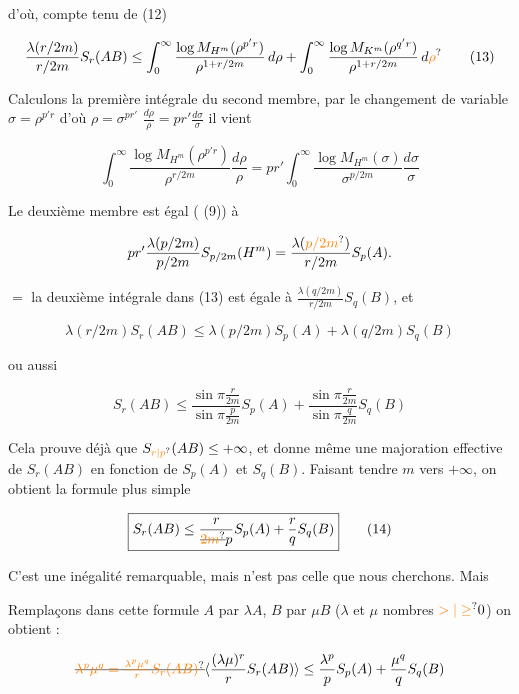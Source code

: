 d'où, compte tenu de (12)

\[
\frac{\lambda(r/2m)}{r/2m}S_r(AB)\leq
\int_0^\infty\frac{\log M_{H^m}(\rho^{p'r})}{\rho^{1+r/2m}}\,d\rho+
\int_0^\infty\frac{\log M_{K^m}(\rho^{q'r})}{\rho^{1+r/2m}}\,d\unsure{\rho}
\tag*{(13)}
\]

Calculons  la première intégrale du second membre, par le changement de variable $\sigma=\rho^{p'r}$ d'où $\rho=\sigma^{pr'}$ $\frac{d\rho}{\rho}=pr'\frac{d\sigma}{\sigma}$ il vient

\[
\int_0^\infty\frac{\log M_{H^m}(\rho^{p'r})}{\rho^{r/2m}}\frac{d\rho}{\rho}
=pr'\int_0^\infty\frac{\log M_{H^m}(\sigma)}{\sigma^{p/2m}}\frac{d\sigma}{\sigma}
\]

Le deuxième membre est égal ( (9)) à

\[
pr'\frac{\lambda(p/2m)}{p/2m}S_{p/2m}(H^m)=\frac{\lambda(\unsure{p/2m})}{r/2m}S_p(A).
\]

 $=$ la deuxième intégrale dans (13) est égale à $\frac{\lambda(q/2m)}{r/2m}S_q(B)$, et  

\[
\lambda(r/2m)S_r(AB)\leq\lambda(p/2m)S_p(A)+\lambda(q/2m)S_q(B)
\]

ou aussi

\[
S_r(AB)\leq\frac{\sin\pi\frac{r}{2m}}{\sin\pi\frac{p}{2m}}S_p(A)+
\frac{\sin\pi\frac{r}{2m}}{\sin\pi\frac{q}{2m}}S_q(B)
\]

Cela prouve déjà que $S_{\unsure{r|p}}(AB)\leq+\infty$, et donne même une majoration effective de $S_r(AB)$ en fonction de $S_p(A)$ et $S_q(B)$. Faisant tendre $m$ vers $+\infty$, on obtient la formule plus simple

\[
\boxed{S_r(AB)\leq\frac{r}{\deleted{\unsure{2m}}p}S_p(A)+\frac rq S_q(B)}\tag*{(14)}
\]

C'est une inégalité remarquable, mais n'est pas celle que nous cherchons. Mais 

Remplaçons dans cette formule $A$ par $\lambda A$, $B$ par $\mu B$ ($\lambda$ et $\mu$ nombres $\unsure{>| \geq}0$) on obtient :

\[
\deleted{\unsure{\lambda^p\mu^q=\frac{\lambda^p\mu^q}{r}S_r(AB)}}
\inserted{\frac{(\lambda\mu)^r}{r}S_r(AB)}
\leq\frac{\lambda^p}{p}S_p(A)+\frac{\mu^q}{q}S_q(B)
\]



